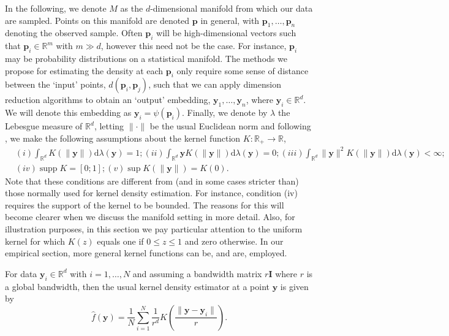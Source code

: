 \documentclass[11pt,a4paper,]{article}
\DeclareMathOperator\supp{supp}
\begin{document}
In the following, we denote \(M\) as the \(d\)-dimensional manifold from which our data are sampled. Points on this manifold are denoted \(\pmb{p}\) in general, with \(\pmb{p}_1,\dots,\pmb{p}_n\) denoting the observed sample. Often \(\pmb{p}_i\) will be high-dimensional vectors such that \(\pmb{p}_i\in\mathbb{R}^m\) with \(m\gg d\), however this need not be the case. For instance, \(\pmb{p}_i\) may be probability distributions on a statistical manifold. The methods we propose for estimating the density at each \(\pmb{p}_i\) only require some sense of distance between the `input' points, \(d(\pmb{p}_i,\pmb{p}_j)\), such that we can apply dimension reduction algorithms to obtain an `output' embedding, \(\pmb{y}_1,\dots,\pmb{y}_n\), where \(\pmb{y}_i\in\mathbb{R}^d\). We will denote this embedding as \(\pmb{y}_i=\psi(\pmb{p}_i)\). Finally, we denote by \(\lambda\) the Lebesgue measure of \(\mathbb{R}^d\), letting \(\|\cdot\|\) be the usual Euclidean norm and following \textcite{Pelletier2005-vu}, we make the following assumptions about the kernel function \(K:\mathbb{R}_+\rightarrow\mathbb{R}\),
\begin{align}
\label{eq:kernelcondition}
& (i) \int_{\mathbb{R}^{d}} K(\|\pmb{y}\|) \mathrm{d} \lambda(\pmb{y})=1;
(ii) \int_{\mathbb{R}^{d}} \pmb{y} K(\|\pmb{y}\|) \mathrm{d} \lambda(\pmb{y})=0;
(iii) \int_{\mathbb{R}^{d}}\|\pmb{y}\|^{2} K(\|\pmb{y}\|) \mathrm{d} \lambda(\pmb{y})<\infty; \\
& (iv) \supp K=[0; 1];
(v) \sup K(\|\pmb{y}\|)=K(0).
\end{align}
Note that these conditions are different from (and in some cases stricter than) those normally used for kernel density estimation. For instance, condition (iv) requires the support of the kernel to be bounded. The reasons for this will become clearer when we discuss the manifold setting in more detail. Also, for illustration purposes, in this section we pay particular attention to the uniform kernel for which \(K(z)\) equals one if \(0\leq z\leq1\) and zero otherwise. In our empirical section, more general kernel functions can be, and are, employed.

For data \(\pmb{y}_i\in\mathbb{R}^d\) with \(i=1,\dots,N\) and assuming a bandwidth matrix \(r\pmb{I}\) where \(r\) is a global bandwidth, then the usual kernel density estimator at a point \(\pmb{y}\) is given by
\begin{equation}
\label{eq:vkde}
\hat{f}(\pmb{y})=\frac{1}{N}\sum\limits_{i=1}^N \frac{1}{r^d} K\left(\frac{\|\pmb{y}-\pmb{y}_i\|}{r}\right).
\end{equation}
\end{document}
